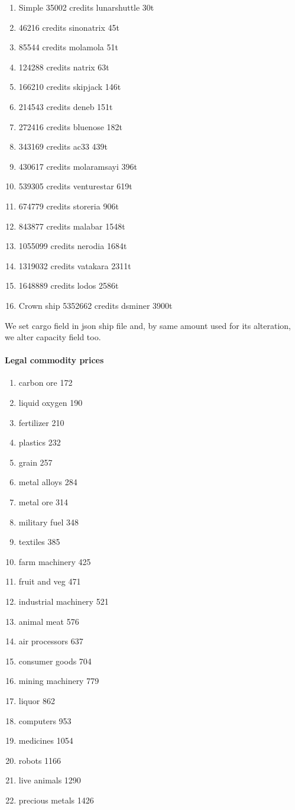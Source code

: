 \documentclass[]{article}
\begin{document}
\begin{enumerate}[label=\Roman*,start=0]
\item 	Simple 35002 credits lunarshuttle	30t
	\item 46216 credits	sinonatrix	45t
		\item 85544 credits	molamola	51t		
		\item 124288 credits	natrix	63t
	\item 166210  credits	skipjack	146t
	\item 214543 credits	deneb	151t			
	\item 272416 credits	bluenose	182t		
	\item 343169  credits	ac33	439t
\item 430617 credits	molaramsayi	396t	
	\item 539305  credits	venturestar	619t
	\item 674779 credits	storeria	906t	
	\item 843877 credits	malabar	1548t
	\item  1055099 credits	nerodia	1684t
	\item  1319032 credits	vatakara	2311t				
	\item 1648889 credits	lodos	2586t			
	\item Crown ship 5352662 credits dsminer	3900t
\end{enumerate}

We set cargo field in json ship file and, by same amount used for its alteration, we alter capacity field too.

\paragraph{Legal commodity prices}
\begin{enumerate}
\item 	carbon ore	172
\item 	liquid oxygen	190
\item 	fertilizer	210
\item 	plastics	232
\item 	grain	257
\item 	metal alloys	284
\item 	metal ore	314
\item 	military fuel	348
\item 	textiles	385
\item 	farm machinery	425
\item 	fruit and veg	471
\item 	industrial machinery	521
\item 	animal meat	576
\item 	air processors	637
\item 	consumer goods	704
\item 	mining machinery	779
\item 	liquor	862
\item 	computers	953
\item 	medicines	1054
\item 	robots	1166
\item 	live animals	1290
\item 	precious metals	1426	
\end{enumerate}
\end{document}
